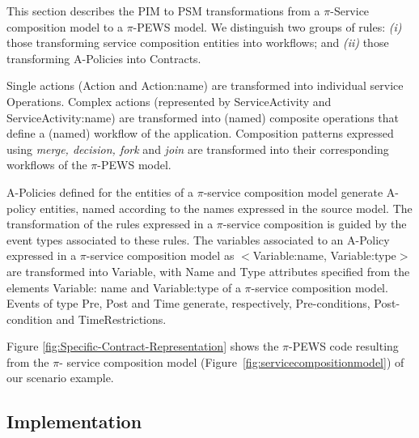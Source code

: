 \documentclass{singlecol-new}
\theoremstyle{TH}{
\newtheorem{lemma}{Lemma}
\newtheorem{theorem}[lemma]{Theorem}
\newtheorem{corrolary}[lemma]{Corrolary}
\newtheorem{conjecture}[lemma]{Conjecture}
\newtheorem{proposition}[lemma]{Proposition}
\newtheorem{claim}[lemma]{Claim}
\newtheorem{stheorem}[lemma]{Wrong Theorem}
\newtheorem{algorithm}{Algorithm}
}
\theoremstyle{THrm}{
\newtheorem{definition}{Definition}[section]
\newtheorem{question}{Question}[section]
\newtheorem{remark}{Remark}
\newtheorem{scheme}{Scheme}
}
\theoremstyle{THhit}{
\newtheorem{case}{Case}[section]
}
\theoremstyle{THhsl}{
\newtheorem{example}{Example}
}
\begin{document}
This section describes the PIM to PSM transformations from a $\pi$-Service composition mod\-el to a $\pi$-PEWS model. 
We distinguish two groups of rules: \textit{(i)} those transforming service composition entities into workflows; and \textit{(ii)} those transforming  A-Policies into Contracts.

Single actions ({\sf Action} and {\sf
Action:name}) are transformed into individual service {\sf Operations}.
Complex actions (rep\-re\-sented by {\sf ServiceActivity}  and  {\sf
ServiceActivity:name}) are transformed into (named) composite
operations that define a (named) workflow of the application.
Composition patterns expressed using  {\em merge, decision, fork} and {\em join} are transformed into their corresponding workflows of the $\pi$-PEWS model.

A-Policies defined for the entities of a $\pi$-service composition model generate {\sf A-policy} entities, named according to the names expres\-sed in the source model.
The transformation of the rules expres\-sed in a $\pi$-service composition is guided by the event types associated to these rules. 
The variables associated to an A-Policy expressed in a $\pi$-service composition model as {\sf $<$Variable:name, Variable:type$>$} are transformed into  {\sf Variable}, with  {\sf Name} and {\sf Type} attributes specified from the elements {\sf Variable: name} and {\sf Variable:type} of a $\pi$-service composition model.
%
Events of type {\sf Pre}, {\sf Post} and {\sf Time} generate, respectively, {\sf Pre-conditions}, {\sf Post-condition} and {\sf TimeRestrictions}.

\begin{example}\label{ex:toPublicMusicT6}
Figure \ref{fig:Specific-Contract-Representation} shows the $\pi$-PEWS code resulting from the $\pi$- service composition model (Figure~\ref{fig:servicecompositionmodel}) of our scenario example.
\end{example}

\subsection{Implementation}
\end{document}
